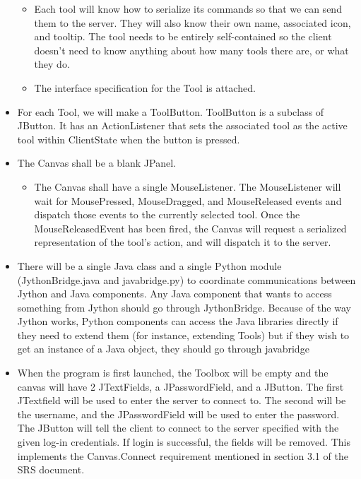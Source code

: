 \documentclass[12pt]{article}
\begin{document}
\begin{itemize}
\begin{itemize}
  \item
  Each tool will know how to serialize its commands so that we can send them to
  the server. They will also know their own name, associated icon, and tooltip.
  The tool needs to be entirely self-contained so the client doesn't need to
  know anything about how many tools there are, or what they do.   \item
  The interface specification for the Tool is attached.
  \end{itemize}
  \item
  For each Tool, we will make a ToolButton. ToolButton is a subclass of JButton. It has an ActionListener that sets the associated tool as the active tool within ClientState when the button is pressed.
  \item
  The Canvas shall be a blank JPanel.
  \begin{itemize}
      \item
      The Canvas shall have a single MouseListener. The MouseListener will wait for MousePressed, MouseDragged, and MouseReleased events and dispatch those events to the currently selected tool. Once the MouseReleasedEvent has been fired, the Canvas will request a serialized representation of the tool's action, and will dispatch it to the server.
  \end{itemize}
  \item
      There will be a single Java class and a single Python module (JythonBridge.java and javabridge.py) to coordinate communications between Jython and Java components. Any Java component that wants to access something from Jython should go through JythonBridge. Because of the way Jython works, Python components can access the Java libraries directly if they need to extend them (for instance, extending Tools) but if they wish to get an instance of a Java object, they should go through javabridge
  \item
     When the program is first launched, the Toolbox will be empty and the
     canvas will have 2 JTextFields, a JPasswordField, and a JButton. The first
     JTextfield will be used to enter the server to connect to. The second will
     be the username, and the JPasswordField will be used to enter the
     password. The JButton will tell the client to connect to the server
     specified with the given log-in credentials. If login is successful, the
     fields will be removed. This implements the Canvas.Connect requirement
     mentioned in section 3.1 of the SRS document.
     \begin{itemize}

\end{itemize}
\end{itemize}
\end{document}
